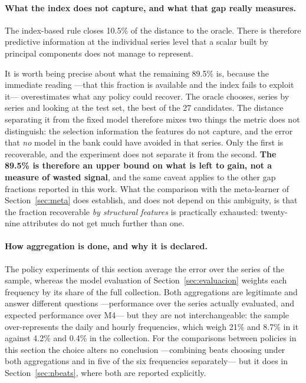 \paragraph{What the index does not capture, and what that gap really measures.} The
index-based rule closes 10.5\% of the distance to the oracle. There is therefore
predictive information at the individual series level that a scalar built by principal
components does not manage to represent.

It is worth being precise about what the remaining 89.5\% is, because the immediate
reading ---that this fraction is available and the index fails to exploit it---
overestimates what any policy could recover. The oracle chooses, series by series and
looking at the test set, the best of the 27 candidates. The distance separating it from
the fixed model therefore mixes two things the metric does not distinguish: the selection
information the features do not capture, and the error that \emph{no} model in the bank
could have avoided in that series. Only the first is recoverable, and the experiment does
not separate it from the second. \textbf{The 89.5\% is therefore an upper bound on what is
left to gain, not a measure of wasted signal}, and the same caveat applies to the other
gap fractions reported in this work. What the comparison with the meta-learner of
Section~\ref{sec:meta} does establish, and does not depend on this ambiguity, is that the
fraction recoverable \emph{by structural features} is practically exhausted:
twenty-nine attributes do not get much further than one.


\paragraph{How aggregation is done, and why it is declared.} The policy experiments of
this section average the error over the series of the sample, whereas the model evaluation
of Section~\ref{sec:evaluacion} weights each frequency by its share of the full
collection. Both aggregations are legitimate and answer different questions ---performance
over the series actually evaluated, and expected performance over M4--- but they are not
interchangeable: the sample over-represents the daily and hourly frequencies, which weigh
21\% and 8.7\% in it against 4.2\% and 0.4\% in the collection. For the comparisons
between policies in this section the choice alters no conclusion ---combining beats
choosing under both aggregations and in five of the six frequencies separately--- but it
does in Section~\ref{sec:nbeats}, where both are reported explicitly.

